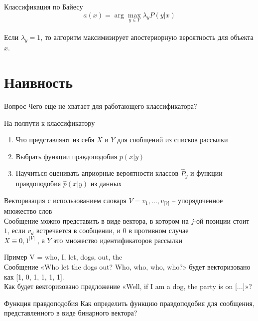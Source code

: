\documentclass[10pt]{beamer}
\begin{document}
\begin{frame}{Классификация по Байесу}
  $$a(x) = \arg\max\limits_{y \in Y} \lambda_y P(y|x)$$\\
  \bigbreak
  Если $\lambda_y = 1$, то алгоритм максимизирует апостериорную вероятность для объекта $x$.
\end{frame}

\section{Наивность}

\begin{frame}{Вопрос}
  \centering
  Чего еще не хватает для \alert{работающего} классификатора?
\end{frame}

\begin{frame} {На полпути к классификатору}
  \begin{enumerate} [<+->]
    \item Что представляют из себя $X$ и $Y$ для сообщений из списков рассылки
    \item Выбрать функции правдоподобия $p(x|y)$
    \item Научиться оценивать априорные вероятности классов $\hat{P}_y$ и функции правдоподобия $\hat{p}(x|y)$ из данных
  \end{enumerate}
\end{frame}

\begin{frame}{Векторизация с использованием словаря}
  $V = {v_1, \dots, v_{|V|}}$ -- упорядоченное множество слов\\
  \bigbreak
  Сообщение можно представить в виде вектора, в котором на $j$-ой позиции стоит $1$, если $v_d$ встречается в сообщении, и $0$ в противном случае\\
  \bigbreak
  $X\equiv {0, 1}^{|V|}$ , а $Y$ это множество идентификаторов рассылки
\end{frame}

\begin{frame}{Пример}
  V = {who, I, let, dogs, out, the}\\
  \pause
  Сообщение «Who let the dogs out? Who, who, who, who?» будет векторизовано как [1, 0, 1, 1, 1, 1].\\
  \pause
  Как будет векторизовано предложение «Well, if I am a dog, the party is on [...]»?
\end{frame}

\begin{frame}{Функция правдоподобия}
  \centering 
  Как определить функцию правдоподобия для сообщения, представленного в виде бинарного вектора?
\end{frame}
\end{document}
